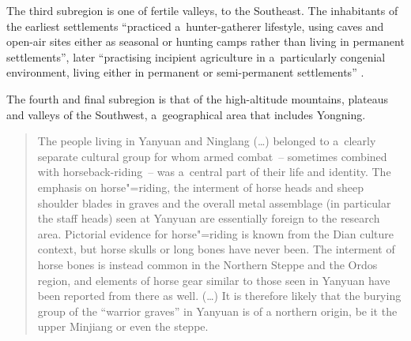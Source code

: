 The third subregion is one of fertile valleys, to the Southeast. The inhabitants of the earliest settlements “practiced a~hunter-gatherer lifestyle, using caves and open-air sites either as seasonal or hunting camps rather than living in permanent settlements”, later “practising incipient agriculture in a~particularly
congenial environment, living either in permanent or semi-permanent settlements” \citep[605-606]{hein2013}.

The fourth and final subregion is that of the high-altitude mountains, plateaus and valleys of the Southwest, a~geographical area that includes Yongning. 

\begin{quotation}
	The people living in Yanyuan  and Ninglang  ({\dots}) belonged to a~clearly
	separate cultural group for whom armed combat~-- sometimes combined with horseback-riding~-- was a~central part of their life and identity. The emphasis on horse"=riding, the interment of horse heads and sheep shoulder blades in
	graves and the overall metal assemblage (in particular the staff heads) seen at Yanyuan are
	essentially foreign to the research area. Pictorial evidence for horse"=riding is known from the
	Dian  culture context, but horse skulls or long bones have never been. The interment of horse
	bones is instead common in the Northern Steppe and the Ordos region, and elements of horse
	gear similar to those seen in Yanyuan have been reported from there as well. ({\dots})
	It is therefore likely that the burying group of the “warrior graves” in Yanyuan is of a
	northern origin, be it the upper Minjiang  or even the steppe. \citep[616-618]{hein2013}
\end{quotation}




%
%

